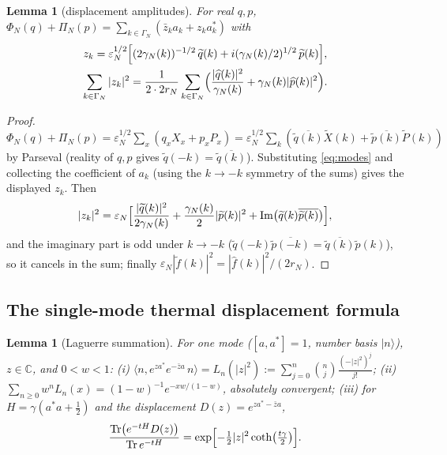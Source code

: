 \documentclass[11pt,a4paper]{article}
\theoremstyle{plain}
\newtheorem{lemma}[theorem]{Lemma}
\theoremstyle{definition}
\newcommand{\C}{\mathbb{C}}
\newcommand{\eps}{\varepsilon}
\newcommand{\ip}[2]{\langle #1,#2\rangle}
\DeclareMathOperator{\Trace}{Tr}
\DeclareMathOperator{\cth}{coth}
\begin{document}
\begin{lemma}[displacement amplitudes]\label{lem:amp}
For real $q,p$,
$\Phi_N(q)+\Pi_N(p)=\sum_{k\in\Gamma_N}(\bar z_ka_k+z_ka_k^*)$ with
\[
\begin{gathered}
 z_k=\eps_N^{1/2}\Bigl[(2\gamma_N(k))^{-1/2}\,\widetilde q(k)
 +i(\gamma_N(k)/2)^{1/2}\,\widetilde p(k)\Bigr],\\
 \sum_{k\in\Gamma_N}|z_k|^2
 =\frac1{2\cdot2r_N}\sum_{k\in\Gamma_N}
 \Bigl(\frac{|\widehat q(k)|^2}{\gamma_N(k)}
 +\gamma_N(k)|\widehat p(k)|^2\Bigr).
\end{gathered}
\]
\end{lemma}

\begin{proof}
$\Phi_N(q)+\Pi_N(p)=\eps_N^{1/2}\sum_x(q_xX_x+p_xP_x)
=\eps_N^{1/2}\sum_k(\overline{\widetilde q(k)}\widetilde X(k)
+\overline{\widetilde p(k)}\widetilde P(k))$ by Parseval (reality of $q,p$
gives $\widetilde q(-k)=\overline{\widetilde q(k)}$). Substituting
\eqref{eq:modes} and collecting the coefficient of $a_k$ (using the $k\to-k$
symmetry of the sums) gives the displayed $z_k$. Then
\[
 |z_k|^2=\eps_N\Bigl[\frac{|\widetilde q(k)|^2}{2\gamma_N(k)}
 +\frac{\gamma_N(k)}2|\widetilde p(k)|^2
 +\operatorname{Im}\bigl(\widetilde q(k)\overline{\widetilde p(k)}\bigr)\Bigr],
\]
and the imaginary part is odd under $k\to-k$
($\widetilde q(-k)\overline{\widetilde p(-k)}
=\overline{\widetilde q(k)}\widetilde p(k)$), so it cancels in the sum;
finally $\eps_N|\widetilde f(k)|^2=|\widehat f(k)|^2/(2r_N)$.
\end{proof}

\subsection{The single-mode thermal displacement formula}

\begin{lemma}[Laguerre summation]\label{lem:laguerre}
For one mode ($[a,a^*]=1$, number basis $|n\rangle$), $z\in\C$, and
$0<w<1$:
\emph{(i)} $\ip{n}{e^{za^*}e^{-\bar za}\,n}=L_n(|z|^2)
:=\sum_{j=0}^n\binom nj\frac{(-|z|^2)^j}{j!}$;
\emph{(ii)} $\sum_{n\ge0}w^nL_n(x)=(1-w)^{-1}e^{-xw/(1-w)}$, absolutely
convergent;
\emph{(iii)} for $H=\gamma(a^*a+\tfrac12)$ and the displacement
$D(z)=e^{za^*-\bar za}$,
\[
 \frac{\Trace\bigl(e^{-tH}D(z)\bigr)}{\Trace e^{-tH}}
 =\exp\Bigl[-\tfrac12|z|^2\cth\bigl(\tfrac{t\gamma}2\bigr)\Bigr].
\]
\end{lemma}
\end{document}
